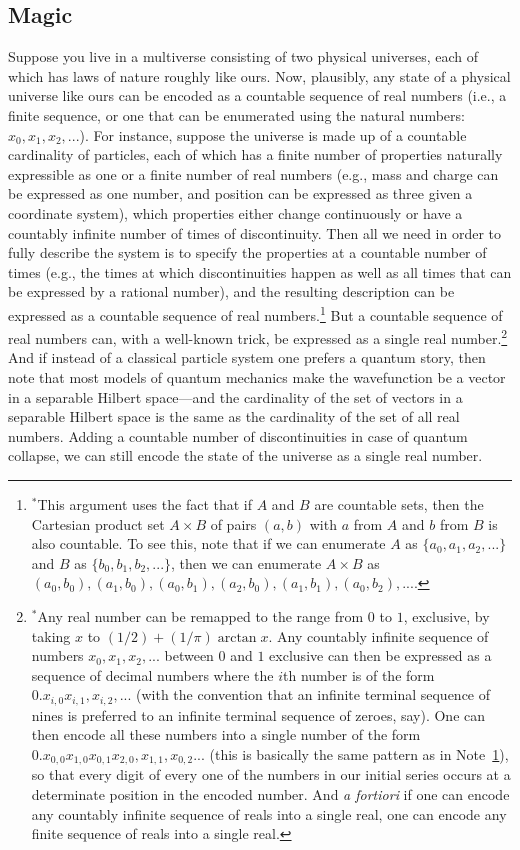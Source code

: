 \subsection{Magic}
Suppose you live in a multiverse consisting of two physical universes, each of which has laws of nature roughly like 
ours. Now, plausibly, any state of a physical universe like ours can be encoded as a countable sequence of real numbers (i.e., a finite
sequence, or one that can be enumerated using the natural numbers: $x_0,x_1,x_2,...$). For instance, suppose the universe is made up of 
a countable cardinality of particles, each of which has a finite number of properties naturally expressible as one or a finite number of real 
numbers (e.g., mass and charge can be expressed as one number, and position can be expressed as three given a coordinate system), which
properties either change continuously or have a countably infinite number of times of discontinuity. Then all we need in order to fully
describe the system is to specify the properties at a countable number of times (e.g., the times at which discontinuities happen as well as
all times that can be expressed by a rational number), and the resulting description can be expressed as a countable sequence of real 
numbers.\footnote{\label{note:product}$^*$This argument uses the fact that if $A$ and $B$ are countable sets, then the Cartesian product set $A\times B$ of pairs $(a,b)$ with
$a$ from $A$ and $b$ from $B$ is also countable. To see this, note that if we can enumerate $A$ as $\{ a_0,a_1,a_2,... \}$ and
$B$ as $\{ b_0,b_1,b_2,... \}$, then we can enumerate $A\times B$ as $(a_0,b_0), (a_1,b_0), (a_0,b_1), (a_2,b_0), (a_1,b_1), (a_0,b_2),...$.} But a countable sequence of real
numbers can, with a well-known trick, be expressed as a single real number.\footnote{\label{note:seq}$^*$Any real number can be remapped to the range
from $0$ to $1$, exclusive, by taking $x$ to $(1/2)+(1/\pi)\arctan x$. Any countably infinite sequence of numbers $x_0,x_1,x_2,...$ between $0$ and $1$ 
exclusive can then be expressed as a sequence of decimal numbers where the $i$th number is of the form $0.x_{i,0}x_{i,1},x_{i,2},...$ (with 
the convention that an infinite terminal sequence of nines is preferred to an infinite terminal sequence of zeroes, say). One can then 
encode all these numbers into a single number of the form 
$0.x_{0,0}x_{1,0}x_{0,1}x_{2,0},x_{1,1},x_{0,2}...$ (this is basically the same pattern as in Note~\ref{note:product}), so that every
digit of every one of the numbers in our initial series occurs at a determinate position in the encoded number. And \textit{a fortiori}
if one can encode any countably infinite sequence of reals into a single real, one can encode any finite sequence of reals into a single
real.} And if instead of a classical particle system one prefers a quantum story, then note that most models of quantum mechanics make 
the wavefunction be a vector in a separable Hilbert space---and the cardinality of the set of vectors in a separable Hilbert space is the 
same as the cardinality of the set of all real numbers. Adding a countable number of discontinuities in case of quantum collapse, we can still
encode the state of the universe as a single real number.

